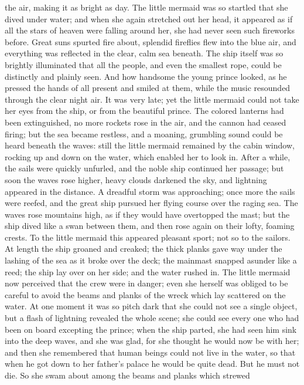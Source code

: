 the air, making it as bright as day. The little mermaid was so
startled that she dived under water; and when she again stretched
out her head, it appeared as if all the stars of heaven were falling
around her, she had never seen such fireworks before. Great suns
spurted fire about, splendid fireflies flew into the blue air, and
everything was reflected in the clear, calm sea beneath. The ship
itself was so brightly illuminated that all the people, and even the
smallest rope, could be distinctly and plainly seen. And how
handsome the young prince looked, as he pressed the hands of all
present and smiled at them, while the music resounded through the
clear night air.
    It was very late; yet the little mermaid could not take her eyes
from the ship, or from the beautiful prince. The colored lanterns
had been extinguished, no more rockets rose in the air, and the cannon
had ceased firing; but the sea became restless, and a moaning,
grumbling sound could be heard beneath the waves: still the little
mermaid remained by the cabin window, rocking up and down on the
water, which enabled her to look in. After a while, the sails were
quickly unfurled, and the noble ship continued her passage; but soon
the waves rose higher, heavy clouds darkened the sky, and lightning
appeared in the distance. A dreadful storm was approaching; once
more the sails were reefed, and the great ship pursued her flying
course over the raging sea. The waves rose mountains high, as if
they would have overtopped the mast; but the ship dived like a swan
between them, and then rose again on their lofty, foaming crests. To
the little mermaid this appeared pleasant sport; not so to the
sailors. At length the ship groaned and creaked; the thick planks gave
way under the lashing of the sea as it broke over the deck; the
mainmast snapped asunder like a reed; the ship lay over on her side;
and the water rushed in. The little mermaid now perceived that the
crew were in danger; even she herself was obliged to be careful to
avoid the beams and planks of the wreck which lay scattered on the
water. At one moment it was so pitch dark that she could not see a
single object, but a flash of lightning revealed the whole scene;
she could see every one who had been on board excepting the prince;
when the ship parted, she had seen him sink into the deep waves, and
she was glad, for she thought he would now be with her; and then she
remembered that human beings could not live in the water, so that when
he got down to her father's palace he would be quite dead. But he must
not die. So she swam about among the beams and planks which strewed
